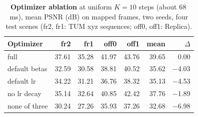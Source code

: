 \begin{table}[t]
\centering
\footnotesize\setlength{\tabcolsep}{2.5pt}
\begin{tabular}{lrrrrrr}
\toprule
\textbf{Optimizer} & fr2 & fr1 & off0 & off1 & mean & $\Delta$ \\
\midrule
full & 37.61 & 35.28 & 41.97 & 43.76 & 39.65 & 0.00 \\
default betas & 32.59 & 30.58 & 38.81 & 40.52 & 35.62 & $-$4.03 \\
default lr & 34.22 & 31.21 & 36.76 & 38.32 & 35.13 & $-$4.53 \\
no lr decay & 35.14 & 32.64 & 40.85 & 42.42 & 37.76 & $-$1.89 \\
none of three & 30.24 & 27.26 & 35.93 & 37.26 & 32.68 & $-$6.98 \\
\bottomrule
\end{tabular}
\caption{\textbf{Optimizer ablation} at uniform $K{=}10$ steps (about 68\,ms), mean PSNR (dB) on mapped frames, two seeds, four test scenes (fr2, fr1: TUM xyz sequences; off0, off1: Replica).}
\label{tab:engineabl}
\end{table}
